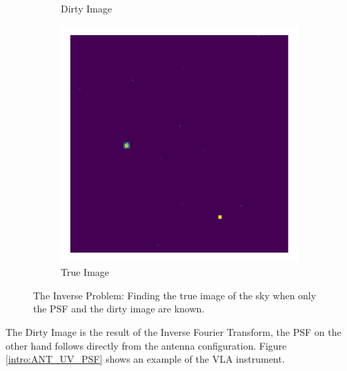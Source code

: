 \begin{figure}[h!]
\begin{subfigure}[b]{0.3\linewidth}
		\caption{Dirty Image}
	\end{subfigure}
	\begin{subfigure}[b]{0.3\linewidth}
		\includegraphics[width=\linewidth, trim={18px 19px 18px 18px}, clip]{./chapters/01.intro/img/true_image.png}
		\caption{True Image}
	\end{subfigure}
	\caption{The Inverse Problem: Finding the true image of the sky when only the PSF and the dirty image are known.}
	\label{intro:inverse_problem}
\end{figure}

The Dirty Image is the result of the Inverse Fourier Transform, the PSF on the other hand follows directly from the antenna configuration. Figure \ref{intro:ANT_UV_PSF} shows an example of the VLA instrument. 

